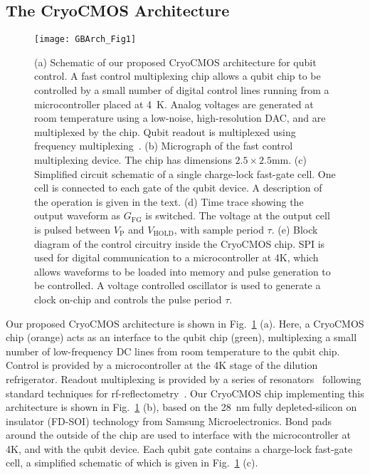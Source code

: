 \subsection{The CryoCMOS Architecture}
\label{sec:gbarch}
\begin{figure}
  \texttt{[image: GBArch\_Fig1]}
  \caption[Schematic of our proposed CryoCMOS architecture]
  {\label{fig:gbarch}(a) Schematic of our proposed CryoCMOS architecture for qubit control. A fast control multiplexing chip allows a qubit chip to be controlled by a small number of digital control lines running from a microcontroller placed at \SI{4}{\kelvin}. Analog voltages are generated at room temperature using a low-noise, high-resolution DAC, and are multiplexed by the chip. Qubit readout is multiplexed using frequency multiplexing~\cite{doi:10.1063/1.4868107}. (b) Micrograph of the fast control multiplexing device. The chip has dimensions $2.5\times2.5\si{\milli\meter}$. (c) Simplified circuit schematic of a single charge-lock fast-gate cell. One cell is connected to each gate of the qubit device. A description of the operation is given in the text. (d) Time trace showing the output waveform as $G_\textrm{FG}$ is switched. The voltage at the output cell is pulsed between $V_\textrm{P}$ and $V_\textrm{HOLD}$, with sample period $\tau$. (e) Block diagram of the control circuitry inside the CryoCMOS chip.  SPI is used for digital communication to a microcontroller at 4K, which allows waveforms to be loaded into memory and pulse generation to be controlled. A voltage controlled oscillator is used to generate a clock on-chip and controls the pulse period $\tau$.}
\end{figure}

Our proposed CryoCMOS architecture is shown in Fig.~\ref{fig:gbarch} (a). Here, a CryoCMOS chip (orange) acts as an interface to the qubit chip (green), multiplexing a small number
of low-frequency DC lines from room temperature to the qubit chip. Control is provided by a microcontroller at the 4K stage of the dilution refrigerator. Readout multiplexing is provided by a series of resonators~\cite{doi:10.1063/1.4868107} following standard techniques for rf-reflectometry~\cite{Reilly:2007ig,barthel2009rapid}. Our CryoCMOS chip implementing this architecture is shown in Fig.~\ref{fig:gbarch} (b), based on the \SI{28}{\nano\meter} fully depleted-silicon on insulator (FD-SOI) technology from Samsung Microelectronics. Bond pads around the outside of the chip are used to interface with the microcontroller at 4K, and with the qubit device. Each qubit gate contains a charge-lock fast-gate cell, a simplified schematic of which is given in Fig.~\ref{fig:gbarch} (c).


